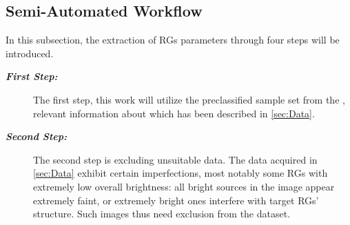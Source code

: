 \documentclass{aa}
\begin{document}
\subsection{Semi-Automated Workflow}\label{sec:Section3_1}
In this subsection, the extraction of RGs parameters through four steps will be introduced.

\begin{description}
    \item[\textbf{\textit{First Step:}}]
    The first step, this work will utilize the preclassified sample set from the \cite{griese_floriangrieseradiogalaxydataset_2022}, relevant information about which has been described in \autoref{sec:Data}.

    \item[\textbf{\textit{Second Step:}}]
    The second step is excluding unsuitable data. The data acquired in \autoref{sec:Data} exhibit certain imperfections, most notably some RGs with extremely low overall brightness: all bright sources in the image appear extremely faint, or extremely bright ones interfere with target RGs' structure. Such images thus need exclusion from the dataset.



\end{description}
\end{document}
